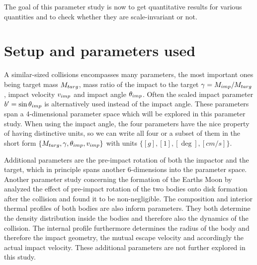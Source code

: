 The goal of this parameter study is now to get quantitative results for various quantities and to check whether they are scale-invariant or not.

\section{Setup and parameters used}
A similar-sized collisions encompasses many parameters, the most important ones being target mass $M_{targ}$, mass ratio of the impact to the target $\gamma = M_{imp} / M_{targ}$, impact velocity $v_{imp}$ and impact angle $\theta_{imp}$. Often the scaled impact parameter $b'=\sin{\theta_{imp}}$ is alternatively used instead of the impact angle. These parameters span a 4-dimensional parameter space which will be explored in this parameter study. When using the impact angle, the four parameters have the nice property of having distinctive units, so we can write all four or a subset of them in the short form $\{M_{targ}, \gamma, \theta_{imp}, v_{imp}\}$ with units $\{[g], [1], [\deg], [cm/s]\}$.

Additional parameters are the pre-impact rotation of both the impactor and the target, which in principle spans another 6-dimensions into the parameter space. Another parameter study concerning the formation of the Earths Moon by \cite{Canup:2008p3551} analyzed the effect of pre-impact rotation of the two bodies onto disk formation after the collision and found it to be non-negligible. The composition and interior thermal profiles of both bodies are also inform parameters. They both determine the density distribution inside the bodies and therefore also the dynamics of the collision. The internal profile furthermore determines the radius of the body and therefore the impact geometry, the mutual escape velocity and accordingly the actual impact velocity. These additional parameters are not further explored in this study.

